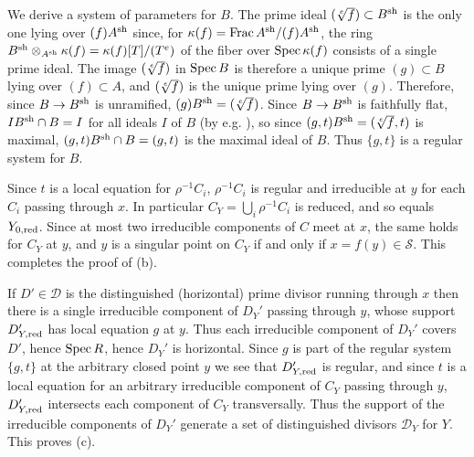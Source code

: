 \documentclass{amsart}
\theoremstyle{plain}
\theoremstyle{definition}
\theoremstyle{remark}
\numberwithin{equation}{section}%
\renewcommand{\S}{{\mathcal S}}
\newcommand{\red}{{\text{\rm red}}}
\newcommand{\sh}{{\text{\rm sh}}}
\newcommand{\Frac}{{\text{\rm Frac}\,}}
\newcommand{\Spec}{{\text{\rm Spec}\,}}
\begin{document}
We derive a system of parameters for $B$.
The prime ideal $(\root e\of f)\subset B^\sh$ is the only one lying over $(f)A^\sh$ since,
for $\kappa(f)=\Frac A^\sh/(f)A^\sh$,
the ring $B^\sh\otimes_{A^\sh}\kappa(f)=\kappa(f)[T]/(T^e)$ of the fiber over $\Spec\kappa(f)$ 
consists of a single prime ideal.
The image $(\root e\of f)$ in $\Spec B$ is therefore a unique prime $(g)\subset B$ lying
over $(f)\subset A$, and $(\root e\of f)$ is the unique prime lying over $(g)$.
Therefore, since $B\to B^\sh$ is unramified, $(g)B^\sh=(\root e\of f)$.
Since $B\to B^\sh$ is faithfully flat, $IB^\sh\cap B=I$ for all ideals $I$ of $B$ (by e.g.
\cite[Exercise 3.16]{AM}), so since $(g,t)B^\sh=(\root e\of f,t)$ is maximal, 
$(g,t)B^\sh\cap B=(g,t)$ is the maximal ideal of $B$.
Thus $\{g,t\}$ is a regular system for $B$.

Since $t$ is a local equation for $\rho^{-1}C_i$, $\rho^{-1}C_i$ is regular
and irreducible at $y$ for each $C_i$ passing through $x$.
In particular $C_Y=\bigcup_i\rho^{-1} C_i$ is reduced, and so equals $Y_{0,\red}$.  
Since at most two irreducible components of $C$ meet at $x$, the same holds for $C_Y$ at $y$,
and $y$ is a singular point on $C_Y$ if and only if $x=f(y)\in\S$.
This completes the proof of (b).

If $D'\in\mathscr D$ is the distinguished (horizontal) prime divisor running through $x$
then there is a single irreducible component of $D_Y'$ passing through $y$, whose 
support $D_{Y,\red}'$ has local equation $g$ at $y$.
Thus each irreducible component of $D_Y'$ covers $D'$, hence $\Spec R$,
hence $D_Y'$ is horizontal.
Since $g$ is part of the regular system $\{g,t\}$ at the arbitrary closed point $y$
we see that $D_{Y,\red}'$ is regular, and since $t$
is a local equation for an arbitrary irreducible component of $C_Y$ passing through $y$,
$D_{Y,\red}'$ intersects each component of $C_Y$ transversally.
Thus the support of the irreducible components of $D_Y'$ generate a set
of distinguished divisors $\mathscr D_Y$ for $Y$.  This proves (c).
\end{document}
